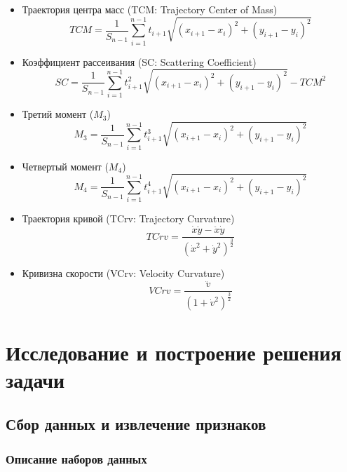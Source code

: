\documentclass[12pt]{article}
\begin{document}
    \begin{itemize}
        \item Траектория центра масс (TCM: Trajectory Center of Mass)
        $$
        TCM = \frac{1}{S_{n-1}} \sum_{i=1}^{n-1} t_{i+1} \sqrt{(x_{i+1} - x_{i})^2 + (y_{i+1} - y_i)^2}
        $$
        \item Коэффициент рассеивания (SC: Scattering Coefficient)
        $$
        SC = \frac{1}{S_{n-1}} \sum_{i=1}^{n-1} t_{i+1}^2 \sqrt{(x_{i+1} - x_{i})^2 + (y_{i+1} - y_i)^2} - TCM^2
        $$
        \item Третий момент ($M_3$)
        $$
        M_3 = \frac{1}{S_{n-1}} \sum_{i=1}^{n-1} t_{i+1}^3 \sqrt{(x_{i+1} - x_{i})^2 + (y_{i+1} - y_i)^2}
        $$
        \item Четвертый момент ($M_4$)
        $$
        M_4 = \frac{1}{S_{n-1}} \sum_{i=1}^{n-1} t_{i+1}^4 \sqrt{(x_{i+1} - x_{i})^2 + (y_{i+1} - y_i)^2}
        $$
        \item Траектория кривой (TCrv: Trajectory Curvature)
        $$
        TCrv = \frac{\dot{x}\ddot{y} - \ddot{x}\dot{y}}{(\dot{x}^2 + \dot{y}^2)^\frac{3}{2}}
        $$
        \item Кривизна скорости (VCrv: Velocity Curvature)
        $$
        VCrv = \frac{\ddot{v}}{(1 + \dot{v}^2)^\frac{3}{2}}
        $$
    \end{itemize}

    \newpage



    \section{Исследование и построение решения задачи}
    \label{sec:Research}
    
    \subsection{Сбор данных и извлечение признаков}
    \label{sec:Research:Data}

    \subsubsection{Описание наборов данных}
    \label{sec:Research:Data:Description}
    
\end{document}
